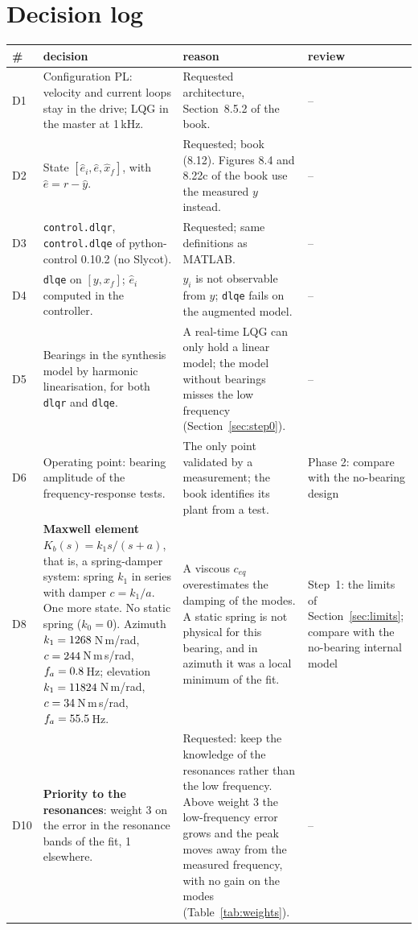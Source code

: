 \documentclass[10pt,a4paper]{article}
\numberwithin{equation}{section}
\begin{document}
\section{Decision log}\label{sec:decisions}
\begin{table}[H]\centering\footnotesize
\setlength{\tabcolsep}{4pt}\begin{tabular}{lL{6.3cm}L{6.3cm}L{2.5cm}}\toprule
\# & decision & reason & review \\ \midrule
D1 & Configuration PL: velocity and current loops stay in the drive; LQG in the master at 1\,kHz. & Requested architecture, Section~8.5.2 of the book. & -- \\
D2 & State $[\hat e_i,\hat e,\hat x_f]$, with $\hat e=r-\hat y$. & Requested; book (8.12). Figures 8.4 and 8.22c of the book use the measured $y$ instead. & -- \\
D3 & \texttt{control.dlqr}, \texttt{control.dlqe} of python-control 0.10.2 (no Slycot). & Requested; same definitions as MATLAB. & -- \\
D4 & \texttt{dlqe} on $[y,x_f]$; $\hat e_i$ computed in the controller. & $y_i$ is not observable from $y$; \texttt{dlqe} fails on the augmented model. & -- \\
D5 & Bearings in the synthesis model by harmonic linearisation, for both \texttt{dlqr} and \texttt{dlqe}. & A real-time LQG can only hold a linear model; the model without bearings misses the low frequency (Section~\ref{sec:step0}). & -- \\
D6 & Operating point: bearing amplitude of the frequency-response tests. & The only point validated by a measurement; the book identifies its plant from a test. & Phase 2: compare with the no-bearing design \\
D8 & \textbf{Maxwell element} $K_b(s)=k_1s/(s+a)$, that is, a spring-damper system: spring $k_1$ in series with damper $c=k_1/a$. One more state. No static spring ($k_0=0$). Azimuth $k_1=1268$\,N\,m/rad, $c=244$\,N\,m\,s/rad, $f_a=0.8$\,Hz; elevation $k_1=11824$\,N\,m/rad, $c=34$\,N\,m\,s/rad, $f_a=55.5$\,Hz. & A viscous $c_{eq}$ overestimates the damping of the modes. A static spring is not physical for this bearing, and in azimuth it was a local minimum of the fit. & Step~1: the limits of Section~\ref{sec:limits}; compare with the no-bearing internal model \\
D10 & \textbf{Priority to the resonances}: weight 3 on the error in the resonance bands of the fit, 1 elsewhere. & Requested: keep the knowledge of the resonances rather than the low frequency. Above weight 3 the low-frequency error grows and the peak moves away from the measured frequency, with no gain on the modes (Table~\ref{tab:weights}). & -- \\

\end{tabular}
\end{table}
\end{document}
